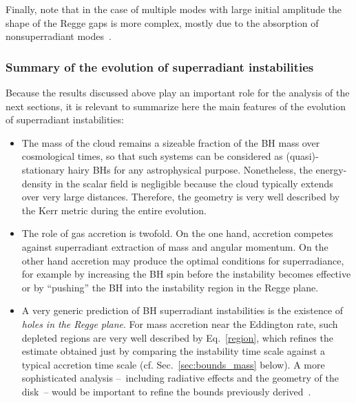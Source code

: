 \documentclass[11pt]{article}
\numberwithin{equation}{section} %
\begin{document}
Finally, note that in the case of multiple modes with large initial amplitude the shape of the Regge gaps is more complex, mostly due to the absorption of nonsuperradiant modes~\cite{Ficarra:2018rfu}.



\subsubsection{Summary of the evolution of superradiant instabilities}

Because the results discussed above play an important role for the analysis of the next sections, it is relevant to summarize here the main features of the evolution of superradiant instabilities:

\begin{itemize}

 \item The mass of the cloud remains a sizeable fraction of the BH mass over cosmological times, so that such systems can be considered as (quasi)-stationary hairy BHs for any astrophysical purpose. Nonetheless, the energy-density in the scalar field is negligible because the cloud typically extends over very large distances. Therefore, the geometry is very well described by the Kerr metric during the entire evolution.
  
 \item The role of gas accretion is twofold. On the one hand, accretion competes against superradiant extraction of mass and angular momentum. On the other hand accretion may produce the optimal conditions for superradiance, for example by increasing the BH spin before the instability becomes effective or by ``pushing'' the BH into the instability region in the Regge plane. 
 
 \item A very generic prediction of BH superradiant instabilities is the existence of \emph{holes in the Regge plane}. For mass accretion near the Eddington rate, such depleted regions are very well described by Eq.~\eqref{region}, which refines the estimate obtained just by comparing the instability time scale against a typical accretion time scale (cf. Sec.~\ref{sec:bounds_mass} below). A more sophisticated analysis --~including radiative effects and the geometry of the disk~-- would be important to refine the bounds previously derived~\cite{Arvanitaki:2010sy,Kodama:2011zc,Pani:2012vp,Brito:2013wya}. 
 
\end{itemize}
\end{document}

